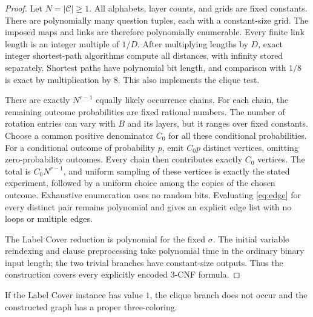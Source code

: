 \begin{proof}
Let $N=|\mathcal C|\ge1$.
All alphabets, layer counts, and grids are fixed constants.
There are polynomially many question tuples, each with a constant-size
grid. The imposed maps and links are therefore polynomially enumerable.
Every finite link length is an integer multiple of $1/D$.
After multiplying lengths by $D$, exact integer shortest-path algorithms
compute all distances, with infinity stored separately.
Shortest paths have polynomial bit length, and comparison with $1/8$
is exact by multiplication by $8$. This also implements the clique test.

There are exactly $N^{r-1}$ equally likely occurrence chains.
For each chain, the remaining outcome probabilities are fixed rational
numbers. The number of rotation entries can vary with $B$ and its layers,
but it ranges over fixed constants. Choose a common positive denominator
$C_0$ for all these conditional probabilities. For a conditional outcome
of probability $p$, emit $C_0p$ distinct vertices, omitting zero-probability
outcomes. Every chain then contributes exactly $C_0$ vertices.
The total is $C_0N^{r-1}$, and uniform sampling of these vertices is
exactly the stated experiment, followed by a uniform choice among the
copies of the chosen outcome. Exhaustive enumeration uses no random
bits. Evaluating \eqref{eq:edge} for every distinct pair remains
polynomial and gives an explicit edge list with no loops or multiple edges.

The Label Cover reduction is polynomial for the fixed $\sigma$.
The initial variable reindexing and clause preprocessing take polynomial
time in the ordinary binary input length; the two trivial branches have
constant-size outputs. Thus the construction covers every explicitly
encoded $3$-CNF formula.
\end{proof}

\begin{lemma}\label{lem:completeness}
If the Label Cover instance has value $1$, the clique branch does not
occur and the constructed graph has a proper three-coloring.
\end{lemma}

